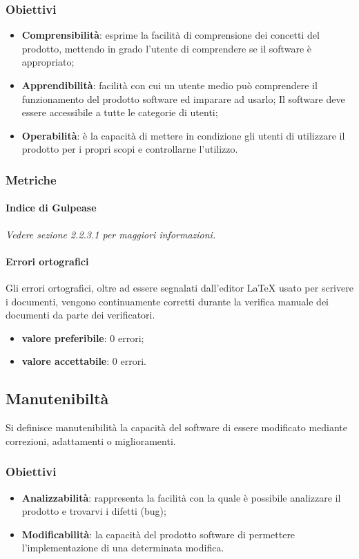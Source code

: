 \subsubsection{Obiettivi}
\begin{itemize}
\item \textbf{Comprensibilità}: esprime la facilità di comprensione dei concetti del prodotto, mettendo in grado l'utente di comprendere se il software è appropriato;
\item \textbf{Apprendibilità}: facilità con cui un utente medio può comprendere il funzionamento del prodotto software ed imparare ad usarlo; Il software deve essere accessibile a tutte le categorie di utenti;
\item \textbf{Operabilità}: è la capacità di mettere in condizione gli utenti di utilizzare il prodotto per i propri scopi e controllarne l'utilizzo.
\end{itemize}

\subsubsection{Metriche}

\paragraph{Indice di Gulpease}
\textit{Vedere sezione 2.2.3.1 per maggiori informazioni.}

\paragraph{Errori ortografici}
Gli errori ortografici, oltre ad essere segnalati dall'editor \LaTeX{} usato per scrivere i documenti, vengono continuamente corretti durante la verifica manuale dei documenti da parte dei verificatori.
\begin{itemize}
\item \textbf{valore preferibile}: 0 errori;
\item \textbf{valore accettabile}: 0 errori.
\end{itemize}

\subsection{Manutenibiltà}
Si definisce manutenibilità la capacità del software di essere modificato mediante correzioni, adattamenti o miglioramenti.

\subsubsection{Obiettivi}
\begin{itemize}
\item \textbf{Analizzabilità}: rappresenta la facilità con la quale è possibile analizzare il prodotto e trovarvi i difetti (bug);
\item \textbf{Modificabilità}: la capacità del prodotto software di permettere l'implementazione di una determinata modifica.
\end{itemize}

